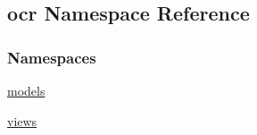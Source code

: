 \hypertarget{namespaceocr}{}\subsection{ocr Namespace Reference}
\label{namespaceocr}
\subsubsection*{Namespaces}
\begin{DoxyCompactItemize}
\item 
 \hyperlink{namespaceocr_1_1models}{models}
\item 
 \hyperlink{namespaceocr_1_1views}{views}
\end{DoxyCompactItemize}
